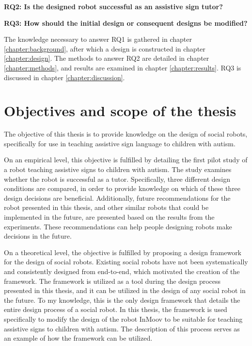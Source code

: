 \noindent\textbf{RQ2: Is the designed robot successful as an assistive sign tutor?}
\vspace{3mm}

\noindent\textbf{RQ3: How should the initial design or consequent designs be modified?}
\vspace{3mm}


The knowledge necessary to answer RQ1 is gathered in chapter \ref{chapter:background}, after which a design is constructed in chapter \ref{chapter:design}. The methods to answer RQ2 are detailed in chapter \ref{chapter:methods}, and results are examined in chapter \ref{chapter:results}. RQ3 is discussed in chapter \ref{chapter:discussion}.



\section{Objectives and scope of the thesis}

The objective of this thesis is to provide knowledge on the design of social robots, specifically for use in teaching assistive sign language to children with autism. 

On an empirical level, this objective is fulfilled by detailing the first pilot study of a robot teaching assistive signs to children with autism. The study examines whether the robot is successful as a tutor. Specifically, three different design conditions are compared, in order to provide knowledge on which of these three design decisions are beneficial. Additionally, future recommendations for the robot presented in this thesis, and other similar robots that could be implemented in the future, are presented based on the results from the experiments. These recommendations can help people designing robots make decisions in the future.

On a theoretical level, the objective is fulfilled by proposing a design framework for the design of social robots. Existing social robots have not been systematically and consistently designed from end-to-end, which motivated the creation of the framework. The framework is utilized as a tool during the design process presented in this thesis, and it can be utilized in the design of any social robot in the future. To my knowledge, this is the only design framework that details the entire design process of a social robot. In this thesis, the framework is used specifically to modify the design of the robot InMoov to be suitable for teaching assistive signs to children with autism. The description of this process serves as an example of how the framework can be utilized.


